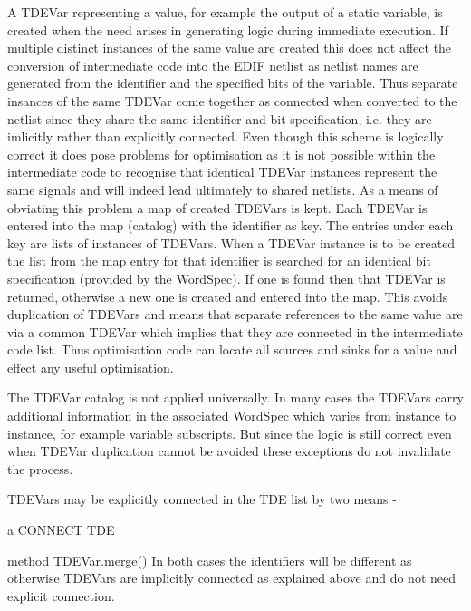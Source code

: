         A TDEVar representing a value, for example the output of a static
        variable, is created when the need arises in generating logic during
        immediate execution. If multiple distinct instances of the same value
        are created this does not affect the conversion of intermediate code
        into the EDIF netlist as netlist names are generated from the identifier
        and the specified bits of the variable. Thus separate insances of the
        same TDEVar come together as connected when converted to the netlist
        since they share the same identifier and bit specification, i.e. they
        are imlicitly rather than explicitly connected. Even though this scheme
        is logically correct it does pose problems for optimisation as it is not
        possible within the intermediate code to recognise that identical TDEVar
        instances represent the same signals and will indeed lead ultimately to
        shared netlists. As a means of obviating this problem a map of created
        TDEVars is kept. Each TDEVar is entered into the map (catalog) with the
        identifier as key. The entries under each key are lists of instances of
        TDEVars. When a TDEVar instance is to be created the list from the map
        entry for that identifier is searched for an identical bit specification
        (provided by the WordSpec). If one is found then that TDEVar is
        returned, otherwise a new one is created and entered into the map. This
        avoids duplication of TDEVars and means that separate references to the
        same value are via a common TDEVar which implies that they are connected
        in the intermediate code list. Thus optimisation code can locate all
        sources and sinks for a value and effect any useful optimisation.

        The TDEVar catalog is not applied universally. In many cases the TDEVars
        carry additional information in the associated WordSpec which varies from
        instance to instance, for example variable subscripts. But since the
        logic is still correct even when TDEVar duplication cannot be avoided
        these exceptions do not invalidate the process.

        TDEVars may be explicitly connected in the TDE list by two
        means -
        \blist
        \item   a CONNECT TDE
        \item   method TDEVar.merge()
        \blend
        In both cases the identifiers will be different as otherwise TDEVars are
        implicitly connected as explained above and do not need explicit
        connection.

